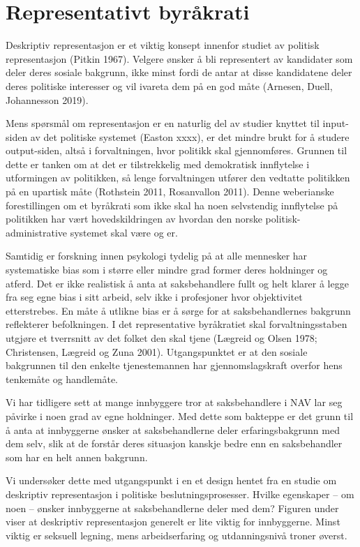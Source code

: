 \documentclass[
]{book}
\begin{document}
\hypertarget{representasjon}{%
\chapter{Representativt byråkrati}\label{representasjon}}

Deskriptiv representasjon er et viktig konsept innenfor studiet av politisk representasjon (Pitkin 1967).
Velgere ønsker å bli representert av kandidater som deler deres sosiale bakgrunn, ikke minst fordi de antar at disse kandidatene deler deres politiske interesser og vil ivareta dem på en god måte (Arnesen, Duell, Johannesson 2019).

Mens spørsmål om representasjon er en naturlig del av studier knyttet til input-siden av det politiske systemet (Easton xxxx), er det mindre brukt for å studere output-siden, altså i forvaltningen, hvor politikk skal gjennomføres.
Grunnen til dette er tanken om at det er tilstrekkelig med demokratisk innflytelse i utformingen av politikken, så lenge forvaltningen utfører den vedtatte politikken på en upartisk måte (Rothstein 2011, Rosanvallon 2011).
Denne weberianske forestillingen om et byråkrati som ikke skal ha noen selvstendig innflytelse på politikken har vært hovedskildringen av hvordan den norske politisk-administrative systemet skal være og er.

Samtidig er forskning innen psykologi tydelig på at alle mennesker har systematiske bias som i større eller mindre grad former deres holdninger og atferd.
Det er ikke realistisk å anta at saksbehandlere fullt og helt klarer å legge fra seg egne bias i sitt arbeid, selv ikke i profesjoner hvor objektivitet etterstrebes.
En måte å utlikne bias er å sørge for at saksbehandlernes bakgrunn reflekterer befolkningen.
I det representative byråkratiet skal forvaltningsstaben utgjøre et tverrsnitt av det folket den skal tjene (Lægreid og Olsen 1978; Christensen, Lægreid og Zuna 2001).
Utgangspunktet er at den sosiale bakgrunnen til den enkelte tjenestemannen har gjennomslagskraft overfor hens tenkemåte og handlemåte.

Vi har tidligere sett at mange innbyggere tror at saksbehandlere i NAV lar seg påvirke i noen grad av egne holdninger.
Med dette som bakteppe er det grunn til å anta at innbyggerne ønsker at saksbehandlerne deler erfaringsbakgrunn med dem selv, slik at de forstår deres situasjon kanskje bedre enn en saksbehandler som har en helt annen bakgrunn.

Vi undersøker dette med utgangspunkt i en et design hentet fra en studie om deskriptiv representasjon i politiske beslutningsprosesser.
Hvilke egenskaper -- om noen -- ønsker innbyggerne at saksbehandlerne deler med dem?
Figuren under viser at deskriptiv representasjon generelt er lite viktig for innbyggerne.
Minst viktig er seksuell legning, mens arbeidserfaring og utdanningsnivå troner øverst.
\end{document}
